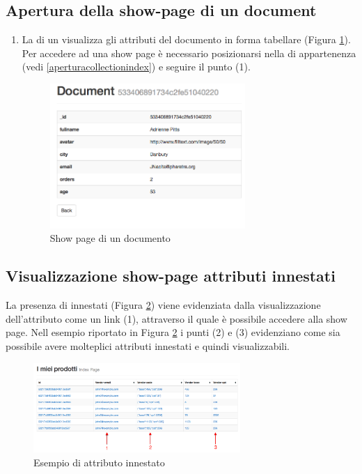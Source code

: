 	\clearpage
	\subsection{Apertura della show-page di un document} %
	\label{aperturashowpage}
		\begin{enumerate}
			\item La  di un  visualizza gli attributi del documento in forma tabellare (Figura \ref{fig:showpage}). Per accedere ad una show page è necessario posizionarsi nella  di appartenenza (vedi \ref{aperturacollectionindex}) e seguire il punto (1).

			\begin{figure}[H]
			\label{fig:showpage}
				\centering \includegraphics[width=0.7\textwidth]{img/showpage.png}
			\caption{\label{fig:showpage} Show page di un documento}
			\end{figure}
		\end{enumerate}

	\subsection{Visualizzazione show-page attributi innestati} %
			La presenza di  innestati (Figura \ref{fig:attributiInnestati}) viene evidenziata dalla visualizzazione dell'attributo come un link (1), attraverso il quale è possibile accedere alla show page. Nell esempio riportato in Figura \ref{fig:attributiInnestati} i punti (2) e (3) evidenziano come sia possibile avere molteplici attributi innestati e quindi visualizzabili.

			\begin{figure}[H]
			\label{fig:showpage}
				\centering \includegraphics[width=0.7\textwidth]{img/attributiInnestati.png}
			\caption{\label{fig:attributiInnestati} Esempio di attributo innestato}
			\end{figure}


